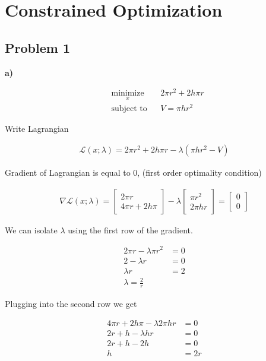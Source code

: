 \section{Constrained Optimization}

\subsection{Problem 1}
\textbf{a)}

\begin{equation*}
\begin{aligned}
& \underset{x}{\text{minimize}}
& & 2 \pi r^2 + 2 h \pi r \\
& \text{subject to}
& & V = \pi h r^2
\end{aligned}
\end{equation*}

Write Lagrangian

\begin{align*}
	\mathcal{L}(x;\lambda) = 2 \pi r^2 + 2 h \pi r - \lambda(\pi h r^2-V)
\end{align*}

Gradient of Lagrangian is equal to 0, (first order optimality condition)

\begin{align*}
	\nabla \mathcal{L}(x;\lambda) = 
	\begin{bmatrix}
		2\pi r \\
		4 \pi r + 2 h \pi	
	\end{bmatrix} - \lambda
	\begin{bmatrix}
		\pi r^2 \\
		2 \pi h r
	\end{bmatrix} = \begin{bmatrix} 0 \\ 0	\end{bmatrix}
\end{align*}

We can isolate $\lambda$ using the first row of the gradient.

\begin{align*}
	2 \pi r - \lambda \pi r^2 &= 0 \\
	2 - \lambda r &= 0 \\
	\lambda r &= 2 \\
	\lambda = \frac{2}{r}
\end{align*}

Plugging into the second row we get

\begin{align*}
	4 \pi r + 2 h \pi - \lambda 2 \pi h r &= 0 \\
	2 r + h - \lambda h r &= 0 \\
	2 r + h - 2 h &= 0 \\
	h &= 2r
\end{align*}


